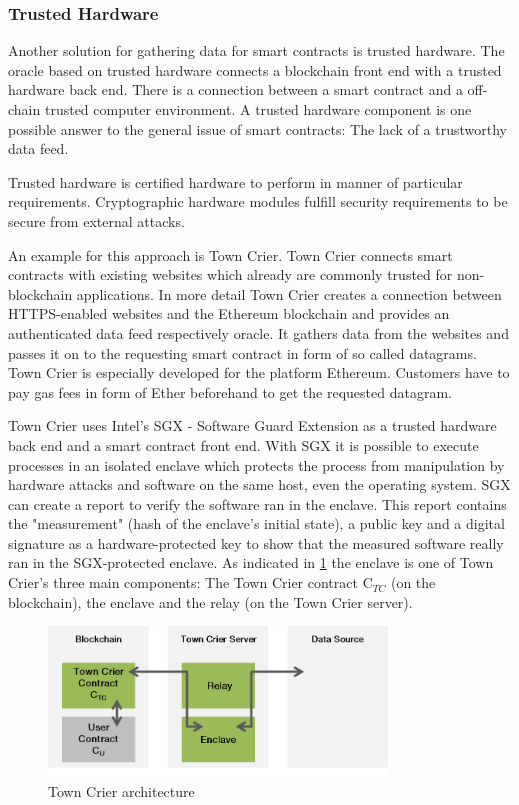 \documentclass[conference]{IEEEtran}
\begin{document}
\subsubsection{Trusted Hardware}
Another solution for gathering data for smart contracts is trusted hardware. The oracle based on trusted hardware connects a blockchain front end with a trusted hardware back end. There is a connection between a smart contract and a off-chain trusted computer environment. A trusted hardware component is one possible answer to the general issue of smart contracts: The lack of a trustworthy data feed. \cite{Zhang2016} \par 
Trusted hardware is certified hardware to perform in manner of particular requirements. Cryptographic hardware modules fulfill security requirements to be secure from external attacks. \cite{Sion2009} \par 
An example for this approach is Town Crier. Town Crier connects smart contracts with existing websites which already are commonly trusted for non-blockchain applications. In more detail Town Crier creates a connection between HTTPS-enabled websites and the Ethereum blockchain and provides an authenticated data feed respectively oracle. It gathers data from the websites and passes it on to the requesting smart contract in form of so called datagrams. Town Crier is especially developed for the platform Ethereum. Customers have to pay gas fees in form of Ether beforehand to get the requested datagram. \cite{Zhang2016} \par 
Town Crier uses Intel’s SGX - Software Guard Extension as a trusted hardware back end and a smart contract front end. With SGX it is possible to execute processes in an isolated enclave which protects the process from manipulation by hardware attacks and software on the same host, even the operating system. SGX can create a report to verify the software ran in the enclave. This report contains the "measurement" (hash of the enclave's initial state), a public key and a digital signature as a hardware-protected key to show that the measured software really ran in the SGX-protected enclave. As indicated in \ref{towncrier} the enclave is one of Town Crier's three main components: The Town Crier contract C$_{TC}$ (on the blockchain), the enclave and the relay (on the Town Crier server). 
\begin{figure}[h]
	\begin{center}
		\includegraphics[width=9cm]{TownCrier.png}
		\caption{Town Crier architecture}
		\label{towncrier}
	\end{center}
\end{figure}
\end{document}
